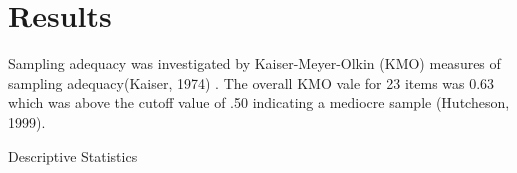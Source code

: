 \documentclass[
  english,
  man]{apa6}
\begin{document}
\hypertarget{results}{%
\section{Results}\label{results}}

Sampling adequacy was investigated by Kaiser-Meyer-Olkin (KMO) measures of sampling adequacy(Kaiser, 1974) . The overall KMO vale for 23 items was 0.63 which was above the cutoff value of .50 indicating a mediocre sample (Hutcheson, 1999).

\begin{table}[tbp]

\begin{center}
\begin{threeparttable}

\caption{\label{tab:tabDes}Descriptive Statistics}


\end{threeparttable}
\end{center}
\end{table}
\end{document}
